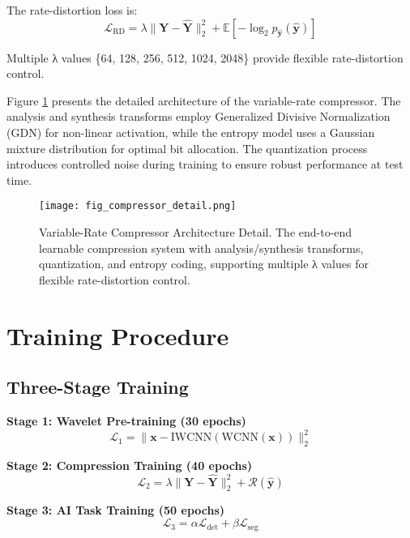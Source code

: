 \documentclass[conference]{IEEEtran}
\begin{document}
The rate-distortion loss is:
\begin{equation}
\mathcal{L}_{\text{RD}} = \lambda \|\mathbf{Y} - \hat{\mathbf{Y}}\|_2^2 + \mathbb{E}[-\log_2 p_{\hat{\mathbf{y}}}(\hat{\mathbf{y}})]
\end{equation}

Multiple λ values \{64, 128, 256, 512, 1024, 2048\} provide flexible rate-distortion control.

Figure \ref{fig:compressor_detail} presents the detailed architecture of the variable-rate compressor. The analysis and synthesis transforms employ Generalized Divisive Normalization (GDN) for non-linear activation, while the entropy model uses a Gaussian mixture distribution for optimal bit allocation. The quantization process introduces controlled noise during training to ensure robust performance at test time.

\begin{figure}[htbp]
\centering
\texttt{[image: fig\_compressor\_detail.png]}
\caption{Variable-Rate Compressor Architecture Detail. The end-to-end learnable compression system with analysis/synthesis transforms, quantization, and entropy coding, supporting multiple λ values for flexible rate-distortion control.}
\label{fig:compressor_detail}
\end{figure}

\section{Training Procedure}

\subsection{Three-Stage Training}

\textbf{Stage 1: Wavelet Pre-training (30 epochs)}
\begin{equation}
\mathcal{L}_1 = \|\mathbf{x} - \text{IWCNN}(\text{WCNN}(\mathbf{x}))\|_2^2
\end{equation}

\textbf{Stage 2: Compression Training (40 epochs)}
\begin{equation}
\mathcal{L}_2 = \lambda \|\mathbf{Y} - \hat{\mathbf{Y}}\|_2^2 + \mathcal{R}(\hat{\mathbf{y}})
\end{equation}

\textbf{Stage 3: AI Task Training (50 epochs)}
\begin{equation}
\mathcal{L}_3 = \alpha \mathcal{L}_{\text{det}} + \beta \mathcal{L}_{\text{seg}}
\end{equation}
\end{document}
